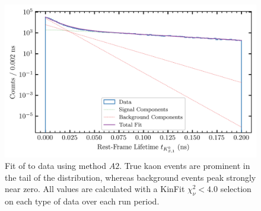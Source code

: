 \begin{figure}
  \begin{center}
    \includegraphics[width=.8\columnwidth]{figures/splot_fit_data_chisqdof_4.0_splot_D_1s_2b.png}
  \end{center}
  \caption{Fit of  to data using method $A2$. True kaon events are prominent in the tail of the distribution, whereas background events peak strongly near zero. All values are calculated with a KinFit $\chi^2_\nu < 4.0$ selection on each type of data over each run period.}\label{fig:splot-A2}
\end{figure}

